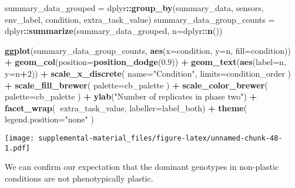 \documentclass[]{book}
\newenvironment{Shaded}{\begin{snugshade}}{\end{snugshade}}
\newcommand{\DataTypeTok}[1]{\textcolor[rgb]{0.13,0.29,0.53}{#1}}
\newcommand{\DecValTok}[1]{\textcolor[rgb]{0.00,0.00,0.81}{#1}}
\newcommand{\FloatTok}[1]{\textcolor[rgb]{0.00,0.00,0.81}{#1}}
\newcommand{\KeywordTok}[1]{\textcolor[rgb]{0.13,0.29,0.53}{\textbf{#1}}}
\newcommand{\NormalTok}[1]{#1}
\newcommand{\OperatorTok}[1]{\textcolor[rgb]{0.81,0.36,0.00}{\textbf{#1}}}
\newcommand{\StringTok}[1]{\textcolor[rgb]{0.31,0.60,0.02}{#1}}
\begin{document}
\begin{Shaded}
\begin{Highlighting}[]
\NormalTok{summary_data_grouped =}\StringTok{ }\NormalTok{dplyr}\OperatorTok{::}\KeywordTok{group_by}\NormalTok{(summary_data, sensors, env_label, condition, extra_task_value)}
\NormalTok{summary_data_group_counts =}\StringTok{ }\NormalTok{dplyr}\OperatorTok{::}\KeywordTok{summarize}\NormalTok{(summary_data_grouped, }\DataTypeTok{n=}\NormalTok{dplyr}\OperatorTok{::}\KeywordTok{n}\NormalTok{())}

\KeywordTok{ggplot}\NormalTok{(summary_data_group_counts, }\KeywordTok{aes}\NormalTok{(}\DataTypeTok{x=}\NormalTok{condition, }\DataTypeTok{y=}\NormalTok{n, }\DataTypeTok{fill=}\NormalTok{condition)) }\OperatorTok{+}
\StringTok{  }\KeywordTok{geom_col}\NormalTok{(}\DataTypeTok{position=}\KeywordTok{position_dodge}\NormalTok{(}\FloatTok{0.9}\NormalTok{)) }\OperatorTok{+}
\StringTok{  }\KeywordTok{geom_text}\NormalTok{(}\KeywordTok{aes}\NormalTok{(}\DataTypeTok{label=}\NormalTok{n, }\DataTypeTok{y=}\NormalTok{n}\OperatorTok{+}\DecValTok{2}\NormalTok{)) }\OperatorTok{+}
\StringTok{  }\KeywordTok{scale_x_discrete}\NormalTok{(}
    \DataTypeTok{name=}\StringTok{"Condition"}\NormalTok{,}
    \DataTypeTok{limits=}\NormalTok{condition_order}
\NormalTok{  ) }\OperatorTok{+}
\StringTok{  }\KeywordTok{scale_fill_brewer}\NormalTok{(}
    \DataTypeTok{palette=}\NormalTok{cb_palette}
\NormalTok{  ) }\OperatorTok{+}
\StringTok{  }\KeywordTok{scale_color_brewer}\NormalTok{(}
    \DataTypeTok{palette=}\NormalTok{cb_palette}
\NormalTok{  ) }\OperatorTok{+}
\StringTok{  }\KeywordTok{ylab}\NormalTok{(}\StringTok{"Number of replicates in phase two"}\NormalTok{) }\OperatorTok{+}
\StringTok{  }\KeywordTok{facet_wrap}\NormalTok{(}\OperatorTok{~}\NormalTok{extra_task_value, }\DataTypeTok{labeller=}\NormalTok{label_both) }\OperatorTok{+}
\StringTok{  }\KeywordTok{theme}\NormalTok{(}
    \DataTypeTok{legend.position=}\StringTok{"none"}
\NormalTok{  )}
\end{Highlighting}
\end{Shaded}

\texttt{[image: supplemental-material\_files/figure-latex/unnamed-chunk-48-1.pdf]}

We can confirm our expectation that the dominant genotypes in non-plastic conditions are not phenotypically plastic.
\end{document}
